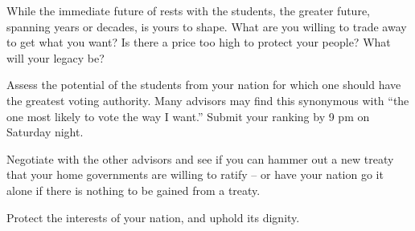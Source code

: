 \documentclass[blue]{GL2020}
\begin{document}
While the immediate future of \pEarth{} rests with the students, the greater future, spanning years or decades, is yours to shape. What are you willing to trade away to get what you want? Is there a price too high to protect your people? What will your legacy be?

\begin{itemz}[Goals]
	\item Assess the potential of the students from your nation for which one should have the greatest voting authority. Many advisors may find this synonymous with ``the one most likely to vote the way I want.'' Submit your ranking by 9 pm on Saturday night.
	\item Negotiate with the other advisors and see if you can hammer out a new treaty that your home governments are willing to ratify -- or have your nation go it alone if there is nothing to be gained from a treaty.
	\item Protect the interests of your nation, and uphold its dignity.
\end{itemz}
\end{document}
